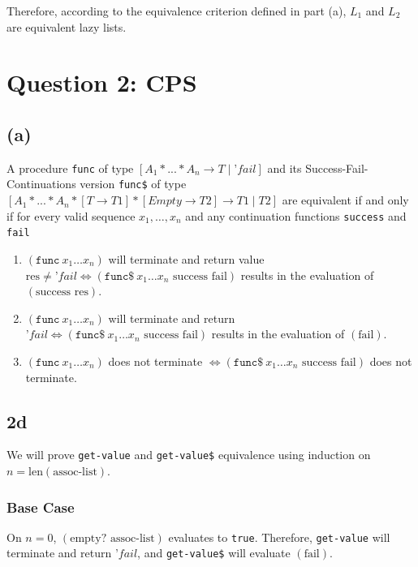 \documentclass{article}
\begin{document}
Therefore, according to the equivalence criterion defined in part (a), \(L_1\) and \(L_2\) are equivalent lazy lists.


\vspace{20pt}
\section*{Question 2: CPS}
\subsection*{(a)}
A procedure \texttt{func} of type \([A_1*...*A_n \rightarrow T \mid \textit{'fail}]\) and its Success-Fail-Continuations version \texttt{func\$} of type \([A_1*...*A_n*[T \rightarrow T1]*[Empty \rightarrow T2] \rightarrow T1 \mid T2]\) are equivalent if and only if for every valid sequence \(x_1, \dots, x_n\) and any continuation functions \texttt{success} and \texttt{fail}


\begin{enumerate}
    \item \((\texttt{func} \ x_1 \dots x_n)\) will terminate and return value \(\text{res} \neq \textit{'fail} \iff (\texttt{func\$} \ x_1 \dots x_n \text{ success } \text{fail})\) results in the evaluation of \((\text{success } \text{res})\).
    
    \item \((\texttt{func} \ x_1 \dots x_n)\) will terminate and return \(\textit{'fail} \iff (\texttt{func\$} \ x_1 \dots x_n \text{ success } \text{fail})\) results in the evaluation of \((\text{fail})\).
    
    \item \((\texttt{func} \ x_1 \dots x_n)\) does not terminate \(\iff (\texttt{func\$}  \ x_1 \dots x_n \text{ success } \text{fail})\) does not terminate.
\end{enumerate}

\subsection*{2d}
We will prove \texttt{get-value} and \texttt{get-value\$} equivalence using induction on \(n = \text{len}(\text{assoc-list})\).

\subsubsection*{Base Case}
On \(n=0\), \((\text{empty? } \text{assoc-list})\) evaluates to \texttt{true}. Therefore, \texttt{get-value} will terminate and return \(\textit{'fail}\), and \texttt{get-value\$} will evaluate \((\text{fail})\).
\end{document}
